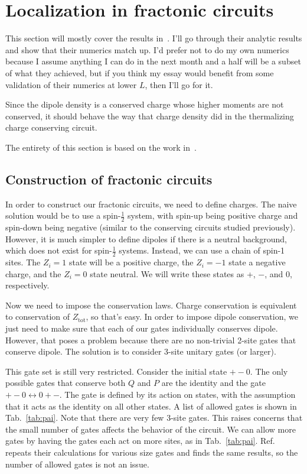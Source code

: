 \documentclass[a4paper,11pt]{article}
\renewcommand{\th}[1]{\frac{1}{#1}}
\begin{document}
\section{Localization in fractonic circuits} \label{sec:fraccirc}

This section will mostly cover the results in~\cite{PaiFracton}. I'll go through their analytic results and show that their numerics match up. I'd prefer not to do my own numerics because I assume anything I can do in the next month and a half will be a subset of what they achieved, but if you think my essay would benefit from some validation of their numerics at lower $L$, then I'll go for it. 

Since the dipole density is a conserved charge whose higher moments are not conserved, it should behave the way that charge density did in the thermalizing charge conserving circuit.

The entirety of this section is based on the work in~\cite{PaiFracton}.

\subsection{Construction of fractonic circuits} \label{sub:construct}

In order to construct our fractonic circuits, we need to define charges. The naive solution would be to use a spin-$\th{2}$ system, with spin-up being positive charge and spin-down being negative (similar to the conserving circuits studied previously). However, it is much simpler to define dipoles if there is a neutral background, which does not exist for spin-$\th{2}$ systems. Instead, we can use a chain of spin-1 sites. The $Z_i=1$ state will be a positive charge, the $Z_i=-1$ state a negative charge, and the $Z_i=0$ state neutral. We will write these states as +, $-$, and 0, respectively.

Now we need to impose the conservation laws. Charge conservation is equivalent to conservation of $Z_\text{tot}$, so that's easy. In order to impose dipole conservation, we just need to make sure that each of our gates individually conserves dipole. However, that poses a problem because there are no non-trivial 2-site gates that conserve dipole. The solution is to consider 3-site unitary gates (or larger).

This gate set is still very restricted. Consider the initial state $+-0$. The only possible gates that conserve both $Q$ and $P$ are the identity and the gate $+-0\leftrightarrow 0+-$. The gate is defined by its action on states, with the assumption that it acts as the identity on all other states. A list of allowed gates is shown in Tab.~\ref{tab:pai}. Note that there are very few 3-site gates. This raises concerns that the small number of gates affects the behavior of the circuit. We can allow more gates by having the gates each act on more sites, as in Tab.~\ref{tab:pai}. Ref.~\cite{PaiFracton} repeats their calculations for various size gates and finds the same results, so the number of allowed gates is not an issue.

\end{document}
